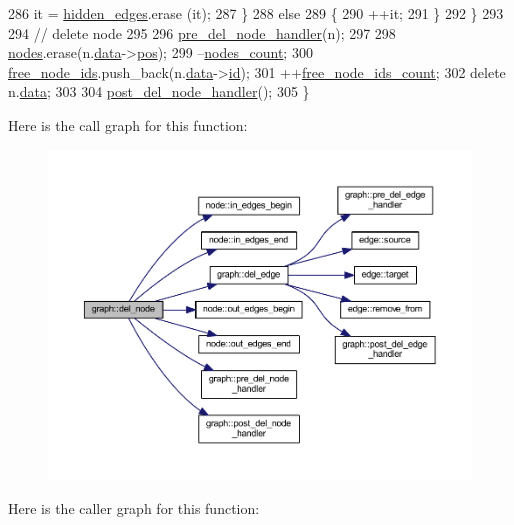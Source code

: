 \begin{DoxyCode}
286         it = \mbox{\hyperlink{classgraph_a0d3da33d047ba7cdc3dc68b5d9c84b88}{hidden\_edges}}.erase (it);
287     \}
288     \textcolor{keywordflow}{else}
289     \{ 
290         ++it;
291     \}
292     \}
293 
294     \textcolor{comment}{// delete node}
295 
296     \mbox{\hyperlink{classgraph_a64699c6cb14cdedab5e13232a8f3e754}{pre\_del\_node\_handler}}(n);
297 
298     \mbox{\hyperlink{classgraph_a4ea0592e8eb7c26c5abad24546907726}{nodes}}.erase(n.\mbox{\hyperlink{classnode_a4ae3d54ebb61be3a102bedf5b91bef75}{data}}->\mbox{\hyperlink{classnode__data_ab3deb00e39c12058e58a99a38507f344}{pos}});
299     --\mbox{\hyperlink{classgraph_a1f59223d0bcf647920963d7a661dd74a}{nodes\_count}};
300     \mbox{\hyperlink{classgraph_ae3f535853434924927a21d7725445aab}{free\_node\_ids}}.push\_back(n.\mbox{\hyperlink{classnode_a4ae3d54ebb61be3a102bedf5b91bef75}{data}}->\mbox{\hyperlink{classnode__data_ac87541ac4470e3c17df808ec9a67f6c4}{id}});
301     ++\mbox{\hyperlink{classgraph_a9480e2310fe64c3a8ad295bb3f119772}{free\_node\_ids\_count}};
302     \textcolor{keyword}{delete} n.\mbox{\hyperlink{classnode_a4ae3d54ebb61be3a102bedf5b91bef75}{data}};
303 
304     \mbox{\hyperlink{classgraph_a4e08a559e3f1007a1a16a53c9a15cb0f}{post\_del\_node\_handler}}();
305 \}
\end{DoxyCode}
Here is the call graph for this function\+:
\nopagebreak
\begin{figure}[H]
\begin{center}
\leavevmode
\includegraphics[width=350pt]{classgraph_a8bdc09d5b9ac4bd26586b054d8fcbe91_cgraph}
\end{center}
\end{figure}
Here is the caller graph for this function\+:
